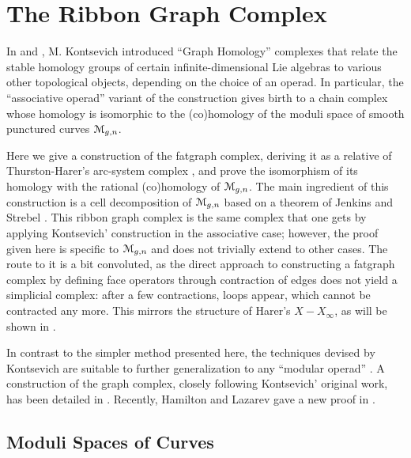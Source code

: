 

\chapter{The Ribbon Graph Complex}
\label{cha:ribbon-graph-complex}

In \cite{kontsevich;1993} and \cite{kontsevich;feynman}, M. Kontsevich
introduced ``Graph Homology'' complexes that relate the stable
homology groups of certain infinite-dimensional Lie algebras to
various other topological objects, depending on the choice of an
operad.  In particular, the ``associative operad'' variant of the
construction gives birth to a chain complex whose homology is
isomorphic to the (co)homology of the moduli space of smooth punctured
curves $\mathcal{M}_{g,n}$.

Here we give a construction of the fatgraph complex, deriving it
as a relative of Thurston-Harer's arc-system complex \cite{%
  harer;cohomological-dimension,%
  harer;cohomology-of-moduli%
},
and prove the isomorphism of its homology with the
rational (co)homology of $\mathcal{M}_{g,n}$.  The main ingredient of this
construction is a cell decomposition of $\mathcal{M}_{g,n}$ based on a theorem
of Jenkins and Strebel \cite{strebel;quadratic-differentials;1983}.
This ribbon graph complex is the same complex that one gets by
applying Kontsevich' construction in the associative case; however,
the proof given here is specific to $\mathcal{M}_{g,n}$ and does not trivially
extend to other cases.  The route to it is a bit convoluted, as the
direct approach to constructing a fatgraph complex by defining
face operators through contraction of edges does not yield a
simplicial complex: after a few contractions, loops appear, which
cannot be contracted any more.  This mirrors the structure of Harer's
$X - X_\infty$, as will be shown in .

In contrast to the simpler method presented here, the techniques
devised by Kontsevich are suitable to further generalization to any
``modular operad'' \cite{getzler-kapranov}.  A construction of the
graph complex, closely following Kontsevich' original work, has been
detailed in \cite{conant-vogtmann;2003}. Recently, Hamilton and
Lazarev gave a new proof in \cite{hamilton-lazarev;math.QA/0608395}.




\section{Moduli Spaces of Curves}
\label{sec:moduli-spaces}


